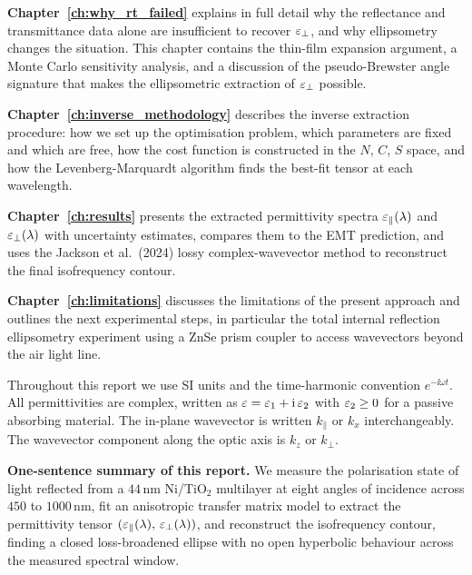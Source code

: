 \textbf{Chapter~\ref{ch:why_rt_failed}} explains in full detail why the
reflectance and transmittance data alone are insufficient to recover $\varepsilon_{\perp}$,
and why ellipsometry changes the situation. This chapter contains the
thin-film expansion argument, a Monte Carlo sensitivity analysis, and a
discussion of the pseudo-Brewster angle signature that makes the ellipsometric
extraction of $\varepsilon_{\perp}$ possible.

\textbf{Chapter~\ref{ch:inverse_methodology}} describes the inverse extraction
procedure: how we set up the optimisation problem, which parameters are fixed
and which are free, how the cost function is constructed in the $N$, $C$, $S$
space, and how the Levenberg-Marquardt algorithm finds the best-fit tensor at
each wavelength.

\textbf{Chapter~\ref{ch:results}} presents the extracted permittivity spectra
$\varepsilon_{\parallel}(\lambda)$ and $\varepsilon_{\perp}(\lambda)$ with uncertainty estimates, compares
them to the EMT prediction, and uses the Jackson et al.\ (2024) lossy
complex-wavevector method to reconstruct the final isofrequency contour.

\textbf{Chapter~\ref{ch:limitations}} discusses the limitations of the present
approach and outlines the next experimental steps, in particular the total
internal reflection ellipsometry experiment using a ZnSe prism coupler to
access wavevectors beyond the air light line.

Throughout this report we use SI units and the time-harmonic convention
$e^{-\ii\omega t}$. All permittivities are complex, written as
$\varepsilon = \varepsilon_1 + \mathrm{i}\,\varepsilon_2$ with $\varepsilon_2 \geq 0$ for a passive absorbing
material. The in-plane wavevector is written $k_\parallel$ or $k_x$
interchangeably. The wavevector component along the optic axis is $k_z$ or
$k_\perp$.

\begin{resultbox}
\textbf{One-sentence summary of this report.}
We measure the polarisation state of light reflected from a $44$\,nm
Ni/TiO$_2$ multilayer at eight angles of incidence across $450$ to $1000$\,nm,
fit an anisotropic transfer matrix model to extract the permittivity tensor
$(\varepsilon_{\parallel}(\lambda),\,\varepsilon_{\perp}(\lambda))$, and reconstruct the isofrequency
contour, finding a closed loss-broadened ellipse with no open hyperbolic
behaviour across the measured spectral window.
\end{resultbox}
